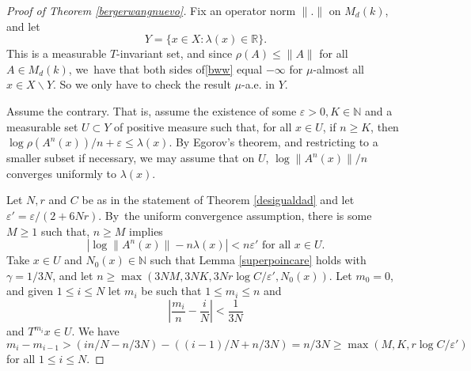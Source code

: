 \documentclass[11pt]{article}
\let\epsilon\varepsilon
\theoremstyle{plain}
\theoremstyle{definition}
\newcommand{\NN}{\mathbb{N}}
\newcommand{\RR}{\mathbb{R}}
\newcommand{\ccl}[3]{#1^{#2}(#3)}
\begin{document}
\begin{proof}[Proof of Theorem \ref{bergerwangnuevo}]
Fix an operator norm $\|.\|$ on $M_{d}(k)$, and let
\[
Y=\{x\in X : \lambda(x)\in \RR\}.
\]
This is a measurable $T$-invariant set, and since $\rho(A)\leq \|A\|$ for all $A\in M_{d}(k)$, we~have that both sides of\eqref{bww} equal $-\infty$ for $\mu$-almost all $x\in X\backslash Y$. So we only have to check the result $\mu$-a.e. in $Y$.

Assume the contrary. That is, assume the existence of some $\epsilon>0, K\in \NN$ and a measurable set $U\subset Y$ of positive measure such that, for all $x\in U$, if $n\geq K$, then $\log{\rho(\ccl{A}{n}{x})}/n+\epsilon \leq \lambda(x)$.
By Egorov's theorem, and restricting to a smaller subset if necessary, we may assume that on $U$, $\log{\|\ccl{A}{n}{x}\|}/n$ converges uniformly to $\lambda(x)$.

Let $N,r$ and $C$ be as in the statement of Theorem \ref{desigualdad} and let $\epsilon'=\epsilon/(2+6Nr)$. By~the uniform convergence assumption, there is some $M\geq 1$ such that, $ n\geq M$ implies
\begin{equation}\label{necesaria1}
|\log{\|\ccl{A}{n}{x}\|}-n\lambda(x)|<n\epsilon' \text{ for all }x\in U.
\end{equation}
Take $x\in U$ and $N_0(x)\in \NN$ such that Lemma \ref{superpoincare} holds with $\gamma=1/3N$, and let $n\geq \max(3NM,3NK,3Nr\log{C}/\epsilon',N_0(x))$. Let $m_0=0$, and given $1\leq i\leq N$ let $m_i$ be such that $1\leq m_i \leq n$ and
\begin{equation}\label{fracrecu}
\left|\frac{m_i}{n}-\frac{i}{N}\right|<\frac{1}{3N}
\end{equation}
and $T^{m_i}x\in U$. We have
\[
m_{i}-m_{i-1}>(in/N-n/3N)-((i-1)/N+n/3N)=n/3N\geq \max(M,K,r\log{C}/\epsilon')
\]
for all $1\leq i\leq N$.


\end{proof}
\end{document}
